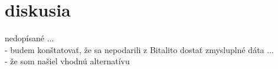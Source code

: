 \chapter{diskusia}
nedopísané ... \\
- budem konštatovať, že sa nepodarili z Bitalito dostať zmysluplné dáta ... \\
- že som našiel vhodnú alternatívu